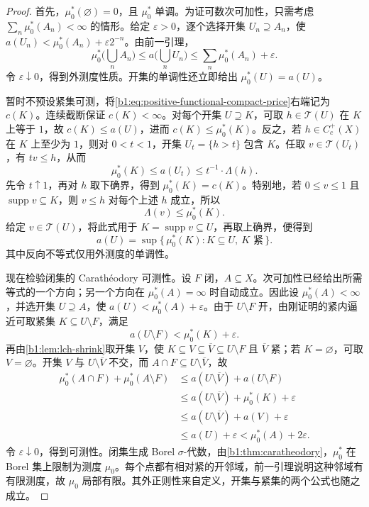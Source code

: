 \begin{proof}
首先，\(\mu_0^*(\varnothing)=0\)，且 \(\mu_0^*\) 单调。为证可数次可加性，只需考虑 \(\sum_n\mu_0^*(A_n)<\infty\) 的情形。给定 \(\varepsilon>0\)，逐个选择开集 \(U_n\supseteq A_n\)，使 \(a(U_n)<\mu_0^*(A_n)+\varepsilon2^{-n}\)。由前一引理，
\[
 \mu_0^*\biggl(\bigcup_n A_n\biggr)
 \leq a\biggl(\bigcup_n U_n\biggr)
 \leq\sum_n\mu_0^*(A_n)+\varepsilon.
\]
令 \(\varepsilon\downarrow0\)，得到外测度性质。开集的单调性还立即给出 \(\mu_0^*(U)=a(U)\)。

暂时不预设紧集可测，将\eqref{b1:eq:positive-functional-compact-price}右端记为 \(c(K)\)。连续截断保证 \(c(K)<\infty\)。对每个开集 \(U\supseteq K\)，可取 \(h\in\mathcal T(U)\) 在 \(K\) 上等于 \(1\)，故 \(c(K)\leq a(U)\)，进而 \(c(K)\leq\mu_0^*(K)\)。反之，若 \(h\in C_c^+(X)\) 在 \(K\) 上至少为 \(1\)，则对 \(0<t<1\)，开集 \(U_t=\{h>t\}\) 包含 \(K\)。任取 \(v\in\mathcal T(U_t)\)，有 \(tv\leq h\)，从而
\[
 \mu_0^*(K)\leq a(U_t)\leq t^{-1}\cdot \Lambda(h).
\]
先令 \(t\uparrow1\)，再对 \(h\) 取下确界，得到 \(\mu_0^*(K)=c(K)\)。特别地，若 \(0\leq v\leq1\) 且 \(\operatorname{supp}v\subseteq K\)，则 \(v\leq h\) 对每个上述 \(h\) 成立，所以
\begin{equation}\label{b1:eq:positive-functional-compact-test}
 \Lambda(v)\leq\mu_0^*(K).
\end{equation}
给定 \(v\in\mathcal T(U)\)，将此式用于 \(K=\operatorname{supp}v\subseteq U\)，再取上确界，便得到
\[
 a(U)=\sup\{\,\mu_0^*(K):K\subseteq U,\ K\text{ 紧}\,\}.
\]
其中反向不等式仅用外测度的单调性。

现在检验闭集的 Carath\'eodory 可测性。设 \(F\) 闭，\(A\subseteq X\)。次可加性已经给出所需等式的一个方向；另一个方向在 \(\mu_0^*(A)=\infty\) 时自动成立。因此设 \(\mu_0^*(A)<\infty\)，并选开集 \(U\supseteq A\)，使 \(a(U)<\mu_0^*(A)+\varepsilon\)。由于 \(U\setminus F\) 开，由刚证明的紧内逼近可取紧集 \(K\subseteq U\setminus F\)，满足
\[
 a(U\setminus F)<\mu_0^*(K)+\varepsilon.
\]
再由\cref{b1:lem:lch-shrink}取开集 \(V\)，使 \(K\subseteq V\subseteq\overline V\subseteq U\setminus F\) 且 \(\overline V\) 紧；若 \(K=\varnothing\)，可取 \(V=\varnothing\)。开集 \(V\) 与 \(U\setminus\overline V\) 不交，而 \(A\cap F\subseteq U\setminus\overline V\)，故
\begin{align*}
 \mu_0^*(A\cap F)+\mu_0^*(A\setminus F)
 &\leq a(U\setminus\overline V)+a(U\setminus F)\\
 &\leq a(U\setminus\overline V)+\mu_0^*(K)+\varepsilon\\
 &\leq a(U\setminus\overline V)+a(V)+\varepsilon\\
 &\leq a(U)+\varepsilon
 <\mu_0^*(A)+2\varepsilon.
\end{align*}
令 \(\varepsilon\downarrow0\)，得到可测性。闭集生成 Borel \(\sigma\)-代数，由\cref{b1:thm:caratheodory}，\(\mu_0^*\) 在 Borel 集上限制为测度 \(\mu_0\)。每个点都有相对紧的开邻域，前一引理说明这种邻域有有限测度，故 \(\mu_0\) 局部有限。其外正则性来自定义，开集与紧集的两个公式也随之成立。


\end{proof}
